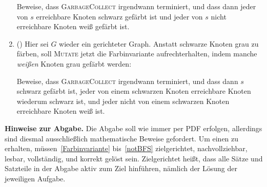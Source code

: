 \documentclass{uebung_cs}
\newcommand{\fett}[1]{\textbf{\boldmath\color{red!60!black}#1}}
\begin{document}
\begin{enumerate}
        Beweise, dass \textsc{GarbageCollect} irgendwann terminiert, und dass dann jeder von $s$ erreichbare Knoten schwarz gefärbt ist und jeder von $s$ nicht erreichbare Knoten weiß gefärbt ist.
    \item (\veryhard) Hier sei $G$ wieder ein gerichteter Graph. Anstatt schwarze Knoten grau zu färben, soll \textsc{Mutate} jetzt die Farbinvariante aufrechterhalten, indem manche \emph{weißen} Knoten grau gefärbt werden:
    \begin{algorithmic}
            \STATE{\fett{färbe $w$ grau}}
            \ENDIF
            \STATE{\fett{färbe $u$ grau}}
            \ENDIF
        \ENDIF{}
    \end{algorithmic}
    Beweise, dass \textsc{GarbageCollect} irgendwann terminiert, und dass dann $s$ schwarz gefärbt ist, jeder von einem schwarzen Knoten erreichbare Knoten wiederum schwarz ist, und jeder nicht von einem schwarzen Knoten erreichbare Knoten weiß ist.
\end{enumerate}

\textbf{Hinweise zur Abgabe.}
Die Abgabe soll wie immer per PDF erfolgen, allerdings sind diesmal ausschließlich mathematische Beweise gefordert. Um einen  zu erhalten, müssen~\ref{Farbinvariante} bis~\ref{notBFS} zielgerichtet, nachvollziehbar, lesbar, vollständig, und korrekt gelöst sein.
Zielgerichtet heißt, dass alle Sätze und Satzteile in der Abgabe aktiv zum Ziel hinführen, nämlich der Lösung der jeweiligen Aufgabe.
\end{document}
